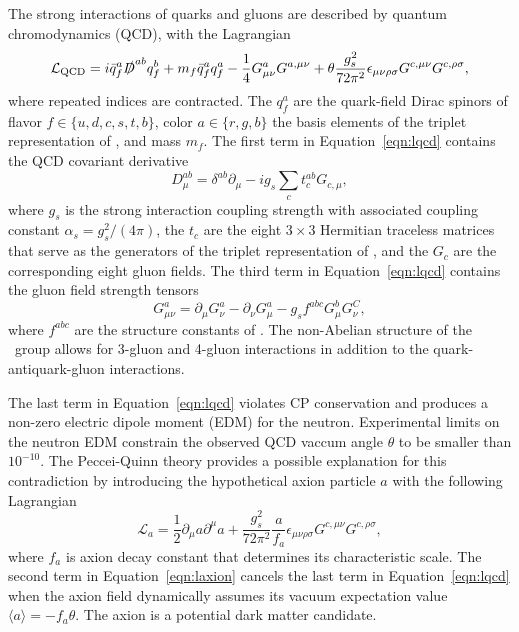 The strong interactions of quarks and gluons are described by quantum chromodynamics (QCD), with the Lagrangian
\begin{equation}
  \label{eqn:lqcd}
  \mathcal{L}_{\text{QCD}} = i \bar q_f^a \slashed D^{ab} q_f^b + m_f \bar q_f^a q_f^a - \frac{1}{4} G_{\mu\nu}^a G^{a,\mu\nu} + \theta \frac{g_s^2}{72\pi^2} \epsilon_{\mu\nu\rho\sigma} G^{c,\mu\nu} G^{c, \rho\sigma},
\end{equation}
where repeated indices are contracted.
The $q_f^a$ are the quark-field Dirac spinors of flavor $f \in \{u,d,c,s,t,b\}$, color $a \in \{r,g,b\}$ the basis elements of the triplet representation of \suthree, and mass $m_f$.
The first term in Equation~\ref{eqn:lqcd} contains the QCD covariant derivative
\begin{equation}
  D_{\mu}^{ab} = \delta^{ab} \partial_\mu - i g_s \sum_{c} t_c^{ab} G_{c,\mu},
\end{equation}
where $g_s$ is the strong interaction coupling strength with associated coupling constant $\alpha_s = g_s^2/(4\pi)$, the $t_c$ are the eight $3\times3$ Hermitian traceless matrices that serve as the generators of the triplet representation of \suthree, and the $G_c$ are the corresponding eight gluon fields.
The third term in Equation~\ref{eqn:lqcd} contains the gluon field strength tensors
\begin{equation}
  G_{\mu\nu}^a = \partial_\mu G_\nu^a - \partial_\nu G_\mu^a - g_s f^{abc} G_\mu^b G_\nu^C,
\end{equation}
where $f^{abc}$ are the structure constants of \suthree.
The non-Abelian structure of the \suthree\ group allows for 3-gluon and 4-gluon interactions in addition to the quark-antiquark-gluon interactions.

The last term in Equation~\ref{eqn:lqcd} violates CP conservation and produces a non-zero electric dipole moment (EDM) for the neutron.
Experimental limits on the neutron EDM constrain the observed QCD vaccum angle $\theta$ to be smaller than $10^{-10}$.
The Peccei-Quinn theory provides a possible explanation for this contradiction by introducing the hypothetical axion particle $a$ with the following Lagrangian %
\begin{equation}
  \label{eqn:laxion}
  \mathcal{L}_a = \frac{1}{2} \partial_\mu a \partial^\mu a + \frac{g_s^2}{72 \pi^2} \frac{a}{f_a} \epsilon_{\mu\nu\rho\sigma} G^{c,\mu\nu} G^{c, \rho\sigma},
\end{equation}
where $f_a$ is axion decay constant that determines its characteristic scale.
The second term in Equation~\ref{eqn:laxion} cancels the last term in Equation~\ref{eqn:lqcd} when the axion field dynamically assumes its vacuum expectation value $\langle a \rangle = - f_a \theta$.
The axion is a potential dark matter candidate.

